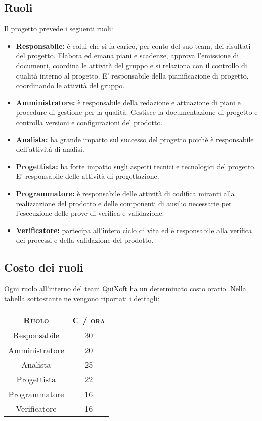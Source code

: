 \documentclass[11pt,a4paper]{article}
\begin{document}
\subsection{Ruoli}
Il progetto prevede i seguenti ruoli:
\begin{itemize}
\item \textbf{Responsabile:} è colui che si fa carico, per conto del suo team, dei risultati del progetto. Elabora ed emana piani e scadenze, approva l'emissione di documenti, coordina le attività del gruppo e si relaziona con il controllo di qualità interno al progetto.
E' responsabile della pianificazione di progetto, coordinando le attività del gruppo.
\item \textbf{Amministratore:} è responsabile della redazione e attuazione di piani e procedure di gestione per la qualità.
Gestisce la documentazione di progetto e controlla versioni e configurazioni del prodotto.
\item \textbf{Analista:} ha grande impatto sul successo del progetto poichè è responsabile dell'attività di analisi.
\item \textbf{Progettista:} ha forte impatto sugli aspetti tecnici e tecnologici del progetto. E' responsabile delle attività di progettazione.
\item \textbf{Programmatore:} è responsabile delle attività di codifica miranti alla realizzazione del prodotto e delle componenti di ausilio necessarie per l'esecuzione delle prove di verifica e validazione.
\item \textbf{Verificatore:}  partecipa all'intero ciclo di vita ed è responsabile alla verifica dei processi e della validazione del prodotto.
\end{itemize}
\subsection{Costo dei ruoli}
Ogni ruolo all'interno del team QuiXoft ha un determinato costo orario. Nella tabella sottostante ne vengono riportati i dettagli:
\begin{center}
\begin{tabular}{|c|c|}
\hline
\textsc{Ruolo} & \textsc{\euro \ / ora}\\ \hline \hline
Responsabile & 30 \\ \hline
Amministratore & 20 \\ \hline
Analista & 25 \\ \hline
Progettista & 22 \\ \hline
Programmatore & 16 \\ \hline
Verificatore & 16 \\ \hline
\end{tabular}
\end{center}
\end{document}
